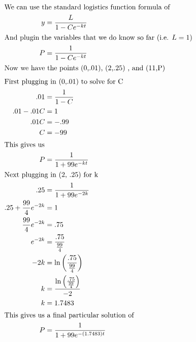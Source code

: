 \documentclass[12pt]{article}
\begin{document}
\begin{align}
  \intertext{We can use the standard logistics function formula of}
  y                                           & =\frac{L}{1-Ce^{-kt}}                                      \\
  \intertext{And plugin the variables that we do know so far (i.e. $L=1$)}
  P                                           & =\frac{1}{1-Ce^{-kt}}                                      \\
  \intertext{Now we have the points (0,.01), (2,.25) , and (11,P)}
  \intertext{First plugging in (0,.01) to solve for C}
  .01                                         & =\frac{1}{1-C}                                             \\
  .01-.01C                                    & =1                                                         \\
  .01C                                        & =-.99                                                      \\
  C                                           & =-99                                                       \\
  \intertext{This gives us}
  P                                           & =\frac{1}{1+99e^{-kt}}                                     \\
  \intertext{Next plugging in (2, .25) for k}
  .25                                         & =\frac{1}{1+99e^{-2k}}                                     \\
  .25+\frac{99}{4}e^{-2k}                     & =1                                                         \\
  \frac{99}{4}e^{-2k}                         & =.75                                                       \\
  e^{-2k}                                     & =\frac{.75}{\frac{99}{4}}                                  \\
  -2k                                         & =\ln\left(\frac{.75}{\frac{99}{4}}\right)                  \\
  k                                           & =\frac{\ln\left(\frac{.75}{\frac{99}{4}}\right)}{-2}       \\
  k                                           & =1.7483                                                    \\
  \intertext{This gives us a final particular solution of}
  P                                           & =\frac{1}{1+99e^{-\left(1.7483\right)t}}                   \\

\end{align}
\end{document}
